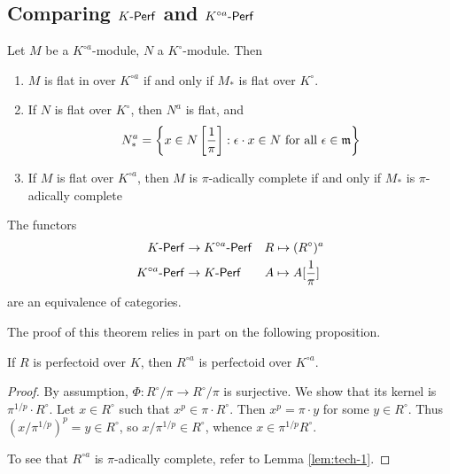 \subsection{Comparing \texorpdfstring{$K\textnormal{-}\mathsf{Perf}$}{K-Perf} and \texorpdfstring{$K^{\circ a}\textnormal{-}\mathsf{Perf}$}{Ko-Perf}} 

\begin{lemma}\label{lem:tech-1}
Let $M$ be a $K^{\circ a}$-module, $N$ a $K^\circ$-module. Then 
\begin{enumerate}
  \item $M$ is flat in over $K^{\circ a}$ if and only if $M_\ast$ is flat over $K^\circ$. 
  \item If $N$ is flat over $K^\circ$, then $N^a$ is flat, and 
    \[
      N_\ast^a = \left\{x\in N\left[\frac 1 \pi\right] : \epsilon\cdot x\in N\text{ for all }\epsilon\in\mathfrak{m}\right\} 
    \]
  \item If $M$ is flat over $K^{\circ a}$, then $M$ is $\pi$-adically complete if 
    and only if $M_\ast$ is $\pi$-adically complete
\end{enumerate}
\end{lemma}

\begin{theorem}
The functors 
\begin{align*}
  K\textnormal{-}\mathsf{Perf} &\to K^{\circ a}\textnormal{-}\mathsf{Perf} && R\mapsto (R^\circ)^a \\
  K^{\circ a}\textnormal{-}\mathsf{Perf} &\to K\textnormal{-}\mathsf{Perf} && A\mapsto A[\frac 1 \pi] 
\end{align*}
are an equivalence of categories. 
\end{theorem}

The proof of this theorem relies in part on the following proposition. 
\begin{proposition}
If $R$ is perfectoid over $K$, then $R^{\circ a}$ is perfectoid over $K^{\circ a}$. 
\end{proposition}
\begin{proof}
By assumption, $\Phi:R^\circ/\pi \to R^\circ/\pi$ is surjective. We show that 
its kernel is $\pi^{1/p}\cdot R^\circ$. Let 
$x\in R^\circ$ such that $x^p\in \pi\cdot R^\circ$. Then $x^p=\pi\cdot y$ for some 
$y\in R^\circ$. Thus $(x/\pi^{1/p})^p = y\in R^\circ$, so 
$x/\pi^{1/p}\in R^\circ$, whence 
$x\in \pi^{1/p} R^\circ$. 

To see that $R^{\circ a}$ is $\pi$-adically complete, refer to Lemma \ref{lem:tech-1}. 
\end{proof}

